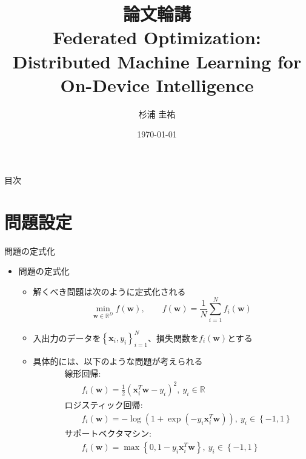 \documentclass[dvipdfmx,notheorems,t]{beamer}
\title[論文輪講: Federated Optimization]{論文輪講 \\ Federated Optimization: \\ Distributed Machine Learning for On-Device Intelligence}
\author{杉浦 圭祐}
\institute[松谷研究室]{慶應義塾大学理工学部情報工学科 松谷研究室}
\date{\today}
\begin{document}
\frame{\titlepage}

\section{}

\begin{frame}{目次}
\tableofcontents
\end{frame}

\section{問題設定}

\begin{frame}{問題の定式化}

\begin{itemize}
	\item 問題の定式化
	\begin{itemize}
		\item 解くべき問題は次のように定式化される
		\begin{equation}
			\min_{\bm{w} \in \mathbb{R}^D} f(\bm{w}), \qquad f(\bm{w}) = \frac{1}{N} \sum_{i = 1}^N f_i(\bm{w})
		\end{equation}
	
		\item 入出力のデータを$\left\{ \bm{x}_i, y_i \right\}_{i = 1}^N$、損失関数を$f_i(\bm{w})$とする
		\item 具体的には、以下のような問題が考えられる
		\begin{eqnarray}
			&& \text{線形回帰}: \nonumber \\
			&& \qquad f_i(\bm{w}) = \frac{1}{2} \left( \bm{x}_i^T \bm{w} - y_i \right)^2, \ y_i \in \mathbb{R} \\
			&& \text{ロジスティック回帰}: \nonumber \\
			&& \qquad f_i(\bm{w}) = - \log \left( 1 + \exp \left( - y_i \bm{x}_i^T \bm{w} \right) \right), \ y_i \in \left\{ -1, 1 \right\} \\
			&& \text{サポートベクタマシン}: \nonumber \\
			&& \qquad f_i(\bm{w}) = \max \left\{ 0, 1 - y_i \bm{x}_i^T \bm{w} \right\}, \ y_i \in \left\{ -1, 1 \right\}
		\end{eqnarray}
	\end{itemize}
\end{itemize}

\end{frame}
\end{document}
